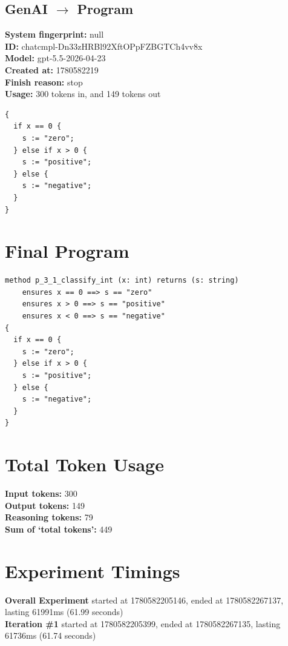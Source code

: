 \documentclass{article}
\begin{document}
\subsection*{GenAI $\rightarrow$ Program}
\textbf{System fingerprint: }null
\\\textbf{ID: }chatcmpl-Dn33zHRBl92XftOPpFZBGTCh4vv8x
\\\textbf{Model: }gpt-5.5-2026-04-23
\\\textbf{Created at: }1780582219
\\\textbf{Finish reason: }stop
\\\textbf{Usage: }300 tokens in, and 149 tokens out
\begin{lstlisting}
{
  if x == 0 {
    s := "zero";
  } else if x > 0 {
    s := "positive";
  } else {
    s := "negative";
  }
}
\end{lstlisting}
\section*{Final Program}
\begin{lstlisting}
method p_3_1_classify_int (x: int) returns (s: string)
	ensures x == 0 ==> s == "zero"
	ensures x > 0 ==> s == "positive"
	ensures x < 0 ==> s == "negative"
{
  if x == 0 {
    s := "zero";
  } else if x > 0 {
    s := "positive";
  } else {
    s := "negative";
  }
}
\end{lstlisting}
\section*{Total Token Usage}
\textbf{Input tokens: }300
\\\textbf{Output tokens: }149
\\\textbf{Reasoning tokens: }79
\\\textbf{Sum of `total tokens': }449
\section*{Experiment Timings}
\textbf{Overall Experiment} started at 1780582205146, ended at 1780582267137, lasting 61991ms (61.99 seconds)
\\\textbf{Iteration \#1} started at 1780582205399, ended at 1780582267135, lasting 61736ms (61.74 seconds)
\end{document}
